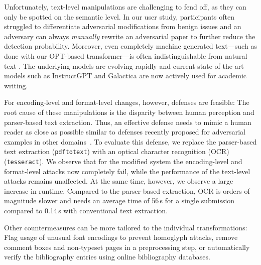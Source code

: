 \documentclass[letterpaper,twocolumn,10pt]{article}
\begin{document}
Unfortunately, text-level manipulations are challenging to fend off, as they can only be spotted on the semantic level. In our user study, participants often {struggled\EndAccSupp{}} to differentiate adversarial modifications from benign issues and an adversary can always \emph{manually} rewrite an adversarial paper to further reduce the detection probability.
Moreover, even completely machine generated text---such as done with our OPT-based transformer---is often {indistinguishable\EndAccSupp{}} from natural text \cite{brown-20-language, mink-22-deepphish}. The underlying models are evolving {rapidly\EndAccSupp{}} and current state-of-the-art models such as 
InstructGPT \cite{ouyang-22-instructgpt} 
and Galactica \cite{taylor-22-galactica} 
are now actively used for academic writing.

For encoding-level and format-level changes, however, defenses are feasible: The root cause of these manipulations is the disparity between human perception and parser-based text extraction. Thus, an effective defense needs to mimic a human reader as close as possible similar to defenses recently proposed for adversarial examples in other domains~\cite[e.g.][]{eisenhofer-21-dompteur}. 
To evaluate this defense, we replace the parser-based text extraction (\texttt{pdftotext}) with an optical character recognition (OCR) (\texttt{tesseract}). We observe that for the modified system the encoding-level and format-level attacks now completely fail, while the performance of the text-level attacks remains unaffected. At the same time, however, we observe a large increase in runtime. Compared to the parser-based extraction, OCR is orders of magnitude {slower\EndAccSupp{}} and needs an average time of 56\,s for a single submission compared to 0.14\,s with conventional text extraction.

Other countermeasures can be more tailored to the individual transformations: Flag usage of {unusual\EndAccSupp{}} font encodings to prevent homoglyph attacks, remove comment boxes and non-typeset pages in a preprocessing step, or automatically verify the bibliography entries using online bibliography databases.
\end{document}
